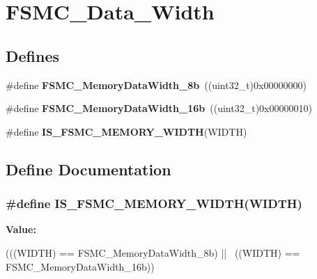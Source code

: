 \hypertarget{group__FSMC__Data__Width}{
\section{FSMC\_\-Data\_\-Width}
\label{group__FSMC__Data__Width}
}
\subsection*{Defines}
\begin{DoxyCompactItemize}
\item 
\hypertarget{group__FSMC__Data__Width_ga5753e089830f19af70a724766e3c329f}{
\#define {\bfseries FSMC\_\-MemoryDataWidth\_\-8b}~((uint32\_\-t)0x00000000)}
\label{group__FSMC__Data__Width_ga5753e089830f19af70a724766e3c329f}

\item 
\hypertarget{group__FSMC__Data__Width_ga65d85c3072e6790ae760ca2248e46df6}{
\#define {\bfseries FSMC\_\-MemoryDataWidth\_\-16b}~((uint32\_\-t)0x00000010)}
\label{group__FSMC__Data__Width_ga65d85c3072e6790ae760ca2248e46df6}

\item 
\#define {\bfseries IS\_\-FSMC\_\-MEMORY\_\-WIDTH}(WIDTH)
\end{DoxyCompactItemize}


\subsection{Define Documentation}
\hypertarget{group__FSMC__Data__Width_ga003d52b62f5950fb041f73f15ce20171}{
\subsubsection[{IS\_\-FSMC\_\-MEMORY\_\-WIDTH}]{\setlength{\rightskip}{0pt plus 5cm}\#define IS\_\-FSMC\_\-MEMORY\_\-WIDTH(WIDTH)}}
\label{group__FSMC__Data__Width_ga003d52b62f5950fb041f73f15ce20171}
{\bfseries Value:}
\begin{DoxyCode}
(((WIDTH) == FSMC_MemoryDataWidth_8b) || \
                                     ((WIDTH) == FSMC_MemoryDataWidth_16b))
\end{DoxyCode}
